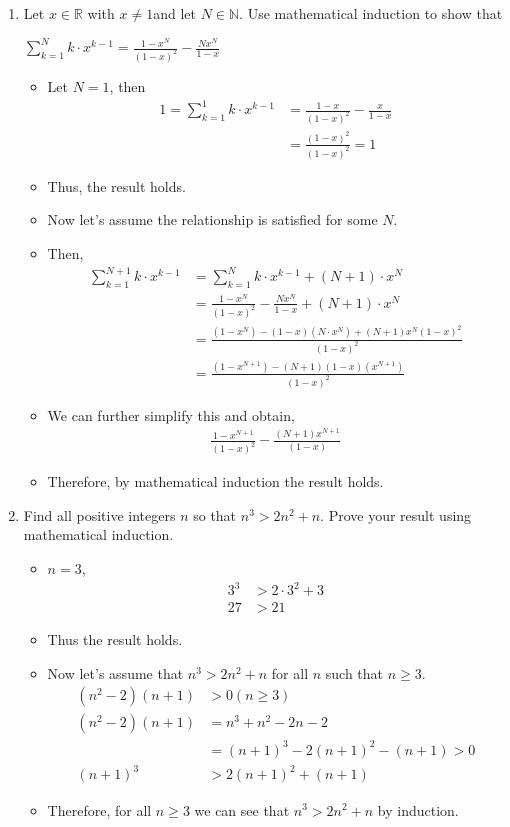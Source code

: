 \documentclass[letterpaper,12pt]{article}
\begin{document}
\begin{enumerate}
\begin{itemize}
	\end{itemize}
	\item Let $x\in \mathbb{R}$ with $x \neq 1$and let $N\in \mathbb{N}$. Use mathematical induction to show that
	\begin{center}
		$\sum_{k=1}^{N}k\cdot x^{k-1} = \frac{1-x^N}{(1-x)^2} - \frac{Nx^N}{1-x}$
	\end{center}
	\begin{itemize}
		\item Let $N=1$, then
		\begin{align}
			1=\sum_{k=1}^1 k \cdot x^{k-1} &= \frac{1-x}{(1-x)^2} - \frac{x}{1-x}\\
			&= \frac{(1-x)^2}{(1-x)^2} = 1
		\end{align}
	\item Thus, the result holds.
	\item Now let's assume the relationship is satisfied for some $N$.
	\item Then,
	\begin{align}
		\sum_{k=1}^{N+1}k\cdot x^{k-1} &= \sum_{k=1}^{N} k \cdot x^{k-1} + (N+1) \cdot x^{N}\\
		&= \frac{1-x^N}{(1-x)^2} - \frac{Nx^N}{1-x} + (N+1) \cdot x^{N} \\ 
		&=\frac{(1-x^N)-(1-x)(N \cdot x^N)+(N+1)x^N(1-x)^2}{(1-x)^2} \\
		&= \frac{(1-x^{N+1}) - (N+1)(1-x)(x^{N+1})}{(1-x)^2}
	\end{align}	
	\item We can further simplify this and obtain, 
	\begin{align}
		\frac{1-x^{N+1}}{(1-x)^2} - \frac{(N+1)x^{N+1}}{(1-x)}
	\end{align}
	\item Therefore, by mathematical induction the result holds.
\end{itemize}
\item Find all positive integers $n$ so that $n^3 > 2n^2+n.$ Prove your result using mathematical induction.
	\begin{itemize}
		\item $n=3$,
		\begin{align}
			3^3 &> 2\cdot3^2+3 \\ 27 &>21
		\end{align}
		\item Thus the result holds.
		\item Now let's assume that $n^3>2n^2+n$ for all $n$ such that $n \geq 3$.
		\begin{align}
			(n^2-2)(n+1)&>0 (n\geq3) \\ (n^2-2)(n+1) &=  n^3+n^2-2n-2
			\\ &= (n+1)^3-2(n+1)^2-(n+1) >0
			\\ (n+1)^3&>2(n+1)^2+(n+1) 
		\end{align}
		\item Therefore, for all $n\geq3$ we can see that $n^3>2n^2+n$ by induction.
	\end{itemize}

	\end{enumerate}



\end{document}
